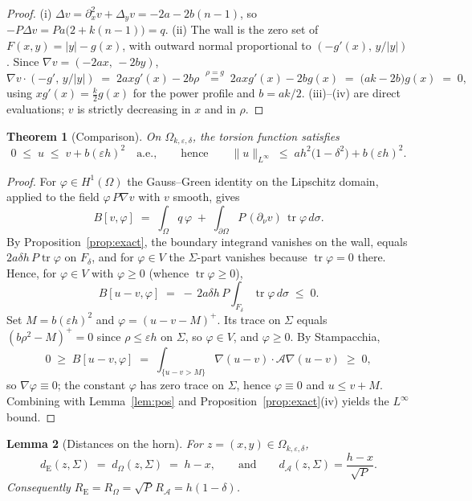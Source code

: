 \documentclass[10pt]{article}
\newtheorem{theorem}{Theorem}[section]
\newtheorem{lemma}[theorem]{Lemma}
\theoremstyle{remark}
\newcommand{\A}{\mathcal{A}}
\newcommand{\Om}{\Omega}
\newcommand{\Sig}{\Sigma}
\newcommand{\dE}{d_{\mathrm{E}}}
\newcommand{\dP}{d_{\Om}}
\newcommand{\dA}{d_{\A}}
\newcommand{\norminf}[1]{\|#1\|_{L^\infty}}
\newcommand{\eps}{\varepsilon}
\begin{document}
\begin{proof}
(i) $\Delta v=\partial_x^2 v+\Delta_y v=-2a-2b(n-1)$, so
$-P\Delta v=Pa\bigl(2+k(n-1)\bigr)=q$.
(ii) The wall is the zero set of $F(x,y)=|y|-g(x)$, with outward normal
proportional to $(-g'(x),\,y/|y|)$. Since
$\nabla v=(-2ax,\,-2by)$,
\[
\nabla v\cdot(-g',\,y/|y|)\;=\;2axg'(x)-2b\rho
\;\overset{\rho=g}{=}\;2axg'(x)-2bg(x)\;=\;\bigl(ak-2b\bigr)g(x)\;=\;0,
\]
using $xg'(x)=\tfrac{k}{2}g(x)$ for the power profile and $b=ak/2$.
(iii)--(iv) are direct evaluations; $v$ is strictly decreasing in $x$ and in
$\rho$.
\end{proof}

\begin{theorem}[Comparison]\label{thm:comparison}
On $\Om_{k,\eps,\delta}$, the torsion function satisfies
\[
0\;\le\;u\;\le\;v+b(\eps h)^2\quad\text{a.e.},
\qquad\text{hence}\qquad
\norminf{u}\;\le\;a h^2\bigl(1-\delta^2\bigr)+b(\eps h)^2 .
\]
\end{theorem}

\begin{proof}
For $\varphi\in H^1(\Om)$ the Gauss--Green identity on the Lipschitz domain,
applied to the field $\varphi\,P\nabla v$ with $v$ smooth, gives
\[
B[v,\varphi]\;=\;\int_\Om q\,\varphi
\;+\;\int_{\partial\Om}P\,(\partial_\nu v)\,\operatorname{tr}\varphi\,d\sigma .
\]
By Proposition~\ref{prop:exact}, the boundary integrand vanishes on the wall,
equals $2a\delta h\,P\operatorname{tr}\varphi$ on $F_\delta$, and for
$\varphi\in V$ the $\Sig$-part vanishes because $\operatorname{tr}\varphi=0$
there. Hence, for $\varphi\in V$ with $\varphi\ge 0$ (whence
$\operatorname{tr}\varphi\ge 0$),
\[
B[u-v,\varphi]\;=\;-\,2a\delta h\,P\int_{F_\delta}\operatorname{tr}\varphi\,
d\sigma\;\le\;0 .
\]
Set $M=b(\eps h)^2$ and $\varphi=(u-v-M)^+$. Its trace on $\Sig$ equals
$(b\rho^2-M)^+=0$ since $\rho\le\eps h$ on $\Sig$, so $\varphi\in V$, and
$\varphi\ge0$. By Stampacchia,
\[
0\;\ge\;B[u-v,\varphi]\;=\;\int_{\{u-v>M\}}\nabla(u-v)\cdot\A\nabla(u-v)
\;\ge\;0,
\]
so $\nabla\varphi\equiv 0$; the constant $\varphi$ has zero trace on $\Sig$,
hence $\varphi\equiv0$ and $u\le v+M$. Combining with Lemma~\ref{lem:pos} and
Proposition~\ref{prop:exact}(iv) yields the $L^\infty$ bound.
\end{proof}

\begin{lemma}[Distances on the horn]\label{lem:dist}
For $z=(x,y)\in\Om_{k,\eps,\delta}$,
\[
\dE(z,\Sig)\;=\;\dP(z,\Sig)\;=\;h-x,
\qquad\text{and}\qquad
\dA(z,\Sig)=\frac{h-x}{\sqrt P}.
\]
Consequently $R_{\mathrm E}=R_\Om=\sqrt{P}\,R_\A=h(1-\delta)$.
\end{lemma}
\end{document}
